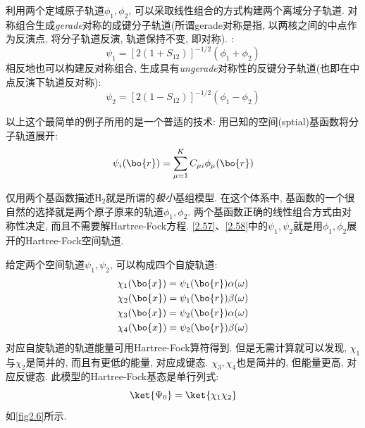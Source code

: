 利用两个定域原子轨道$\phi_1,\phi_2$, 
可以采取线性组合的方式构建两个离域分子轨道. 
对称组合生成\textit{gerade}对称的成键分子轨道(所谓gerade对称是指, 
以两核之间的中点作为反演点, 
将分子轨道反演, 
轨道保持不变, 
即对称).
:
\begin{equation}
\label{2.57}
\psi_1=[2(1+S_{12})]^{-1/2}(\phi_1+\phi_2)
\end{equation}
相反地也可以构建反对称组合, 
生成具有\textit{ungerade}对称性的反键分子轨道(也即在中点反演下轨道反对称):
\begin{equation}
\label{2.58}
\psi_2=[2(1-S_{12})]^{-1/2}(\phi_1-\phi_2)
\end{equation}

以上这个最简单的例子所用的是一个普适的技术: 用已知的空间(sptial)基函数将分子轨道展开: 
\begin{equation}
\label{2.59}
\psi_i(\bo{r})=\sum_{\mu=1}^{K}C_{\mu i}\phi_{\mu}(\bo{r})
\end{equation} 

仅用两个基函数描述H$_2$就是所谓的\emph{极小}基组模型. 
在这个体系中, 
基函数的一个很自然的选择就是两个原子原来的轨道$\phi_1,\phi_2$. 
两个基函数正确的线性组合方式由对称性决定, 
而且不需要解Hartree-Fock方程. 
\autoref{2.57}、\autoref{2.58}中的$\psi_1,\psi_2$就是用$\phi_1,\phi_2$展开的Hartree-Fock空间轨道.


给定两个空间轨道$\psi_1,\psi_2$, 
可以构成四个自旋轨道:
\begin{equation}
\begin{split}
\chi_1(\bo{x})=\psi_1(\bo{r})\alpha(\omega)\\
\chi_2(\bo{x})=\psi_1(\bo{r})\beta(\omega)\\
\chi_3(\bo{x})=\psi_2(\bo{r})\alpha(\omega)\\
\chi_4(\bo{x})=\psi_2(\bo{r})\beta(\omega)
\end{split}
\label{2.60}
\end{equation}
对应自旋轨道的轨道能量可用Hartree-Fock算符得到. 
但是无需计算就可以发现, 
$\chi_1$与$\chi_2$是简并的, 
而且有更低的能量, 
对应成键态. 
$\chi_3,\chi_4$也是简并的, 
但能量更高, 
对应反键态. 
此模型的Hartree-Fock基态是单行列式:
\begin{equation}
\ket{\Psi_0}=\ket{\chi_1\chi_2}
\end{equation}
如\autoref{fig2.6}所示.

